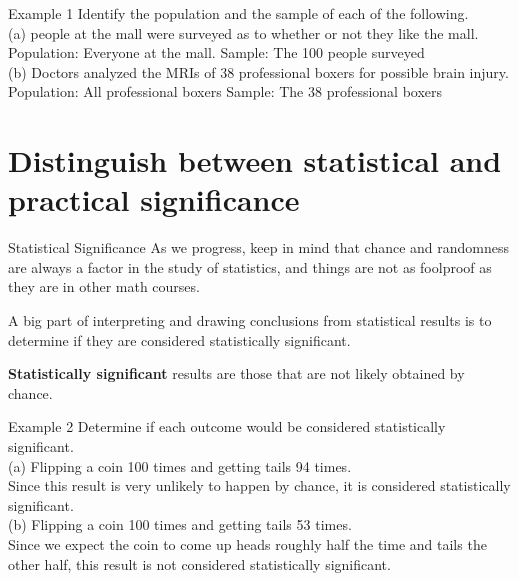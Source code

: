 \documentclass[t]{beamer}
\begin{document}
\begin{frame}{Example 1}
Identify the population and the sample of each of the following.	\newline\\
(a)	 people at the mall were surveyed as to whether or not they like the mall. \newline\\	\pause
Population: Everyone at the mall. \pause	\newline Sample: The 100 people surveyed	\newline\\	\pause
(b)	\quad Doctors analyzed the MRIs of 38 professional boxers for possible brain injury.	\newline\\	\pause
Population: All professional boxers \pause	\newline Sample: The 38 professional boxers
\end{frame}

\section{Distinguish between statistical and practical significance}

\begin{frame}{Statistical Significance}
As we progress, keep in mind that chance and randomness are always a factor in the study of statistics, and things are not as foolproof as they are in other math courses.	\newline\\	\pause

A big part of interpreting and drawing conclusions from statistical results is to determine if they are considered statistically significant.	\newline\\	\pause


\begin{tcolorbox}[colframe=green!20!black, colback = green!30!white,title=\textbf{Statistically Significant}]
\textbf{Statistically significant} results are those that are not likely obtained by chance.
\end{tcolorbox}
\end{frame}

\begin{frame}{Example 2}
Determine if each outcome would be considered statistically significant.	\newline\\
(a)	\quad Flipping a coin 100 times and getting tails 94 times.	\newline\\	\pause
Since this result is very unlikely to happen by chance, it is considered statistically significant.	\newline\\	\pause
(b)	\quad Flipping a coin 100 times and getting tails 53 times.	\newline\\	\pause
Since we expect the coin to come up heads roughly half the time and tails the other half, this result is not considered statistically significant.
\end{frame}
\end{document}
